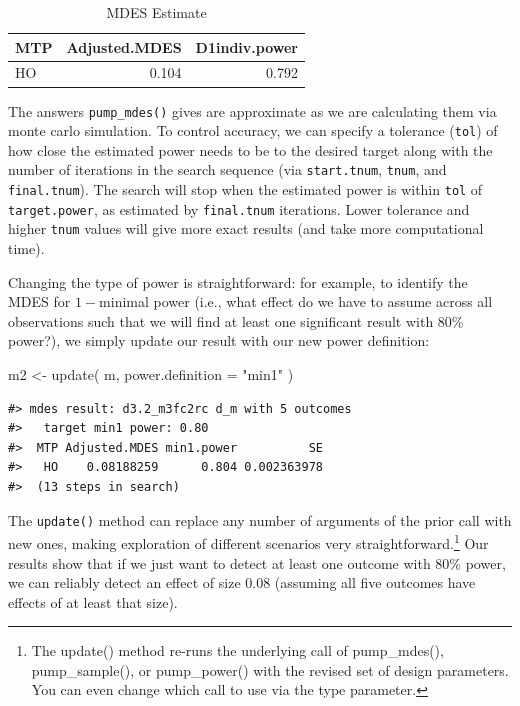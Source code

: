 \documentclass{article}
\newenvironment{Shaded}{\begin{snugshade}}{\end{snugshade}}
\newcommand{\AttributeTok}[1]{\textcolor[rgb]{0.77,0.63,0.00}{#1}}
\newcommand{\FunctionTok}[1]{\textcolor[rgb]{0.00,0.00,0.00}{#1}}
\newcommand{\NormalTok}[1]{#1}
\newcommand{\OtherTok}[1]{\textcolor[rgb]{0.56,0.35,0.01}{#1}}
\newcommand{\StringTok}[1]{\textcolor[rgb]{0.31,0.60,0.02}{#1}}
\begin{document}
\begin{table}[h!]

\caption{\label{tab:unnamed-chunk-3}MDES Estimate}
\centering
\begin{tabular}[t]{lrr}
\toprule
MTP & Adjusted.MDES & D1indiv.power\\
\midrule
HO & 0.104 & 0.792\\
\bottomrule
\end{tabular}
\end{table}

The answers \texttt{pump\_mdes()} gives are approximate as we are
calculating them via monte carlo simulation. To control accuracy, we can
specify a tolerance (\texttt{tol}) of how close the estimated power
needs to be to the desired target along with the number of iterations in
the search sequence (via \texttt{start.tnum}, \texttt{tnum}, and
\texttt{final.tnum}). The search will stop when the estimated power is
within \texttt{tol} of \texttt{target.power}, as estimated by
\texttt{final.tnum} iterations. Lower tolerance and higher \texttt{tnum}
values will give more exact results (and take more computational time).

Changing the type of power is straightforward: for example, to identify
the MDES for \(1-\)minimal power (i.e., what effect do we have to assume
across all observations such that we will find at least one significant
result with 80\% power?), we simply update our result with our new power
definition:

\begin{Shaded}
\begin{Highlighting}[]
\NormalTok{m2 }\OtherTok{\textless{}{-}} \FunctionTok{update}\NormalTok{( m, }\AttributeTok{power.definition =} \StringTok{"min1"}\NormalTok{ )}
\end{Highlighting}
\end{Shaded}

\begin{verbatim}
#> mdes result: d3.2_m3fc2rc d_m with 5 outcomes
#>   target min1 power: 0.80
#>  MTP Adjusted.MDES min1.power          SE
#>   HO    0.08188259      0.804 0.002363978
#>  (13 steps in search)
\end{verbatim}

The \texttt{update()} method can replace any number of arguments of the
prior call with new ones, making exploration of different scenarios very
straightforward.\footnote{The update() method re-runs the underlying
  call of pump\_mdes(), pump\_sample(), or pump\_power() with the
  revised set of design parameters. You can even change which call to
  use via the type parameter.} Our results show that if we just want to
detect at least one outcome with 80\% power, we can reliably detect an
effect of size \(0.08\) (assuming all five outcomes have effects of at
least that size).
\end{document}
